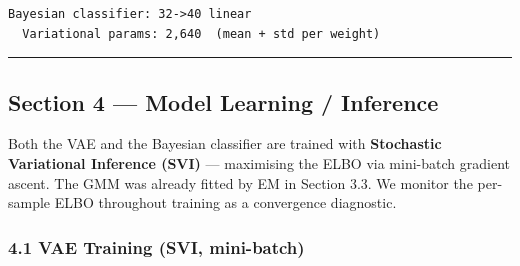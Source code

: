 \documentclass[11pt]{article}
\begin{document}
    \begin{Verbatim}[commandchars=\\\{\}]
Bayesian classifier: 32->40 linear
  Variational params: 2,640  (mean + std per weight)
    \end{Verbatim}

    \begin{center}\rule{0.5\linewidth}{0.5pt}\end{center}

\subsection{Section 4 --- Model Learning /
Inference}\label{section-4-model-learning-inference}

Both the VAE and the Bayesian classifier are trained with
\textbf{Stochastic Variational Inference (SVI)} --- maximising the ELBO
via mini-batch gradient ascent. The GMM was already fitted by EM in
Section 3.3. We monitor the per-sample ELBO throughout training as a
convergence diagnostic.

    \subsubsection{4.1 VAE Training (SVI,
mini-batch)}\label{vae-training-svi-mini-batch}
\end{document}
